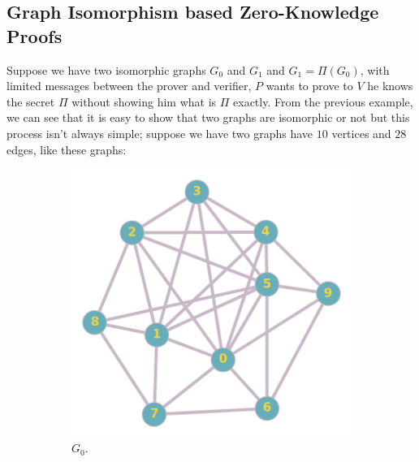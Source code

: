 \documentclass[12pt,a4paper]{article}
\begin{document}
\subsection{Graph Isomorphism based Zero-Knowledge Proofs}
Suppose we have two isomorphic graphs $G_0$ and $G_1$ and $G_1=\Pi(G_0)$, with limited messages between the prover and verifier, $P$ wants to prove to $V$ he knows the secret $\Pi$ without showing him what is $\Pi$ exactly.
From the previous example, we can see that it is easy to show that two graphs are isomorphic or not but this process isn’t always simple; suppose we have two graphs have $10$ vertices and $28$ edges, like these graphs:
\begin{figure}[h!]
	\centering
	\begin{subfigure}[b]{.39\linewidth}
		\includegraphics[width=\linewidth]{ex2_1.png}
		\caption{$G_0$.}
	\end{subfigure}
	\begin{subfigure}[b]{.39\linewidth}

\end{subfigure}
\end{figure}
\end{document}
